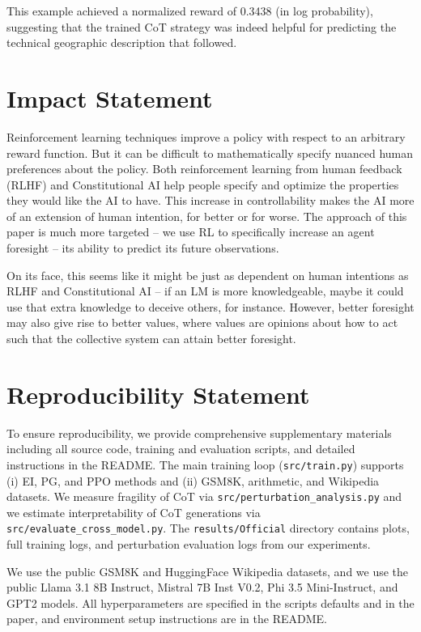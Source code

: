 \documentclass{article}
\begin{document}
This example achieved a normalized reward of 0.3438 (in log probability), suggesting that the trained CoT strategy was indeed helpful for predicting the technical geographic description that followed.


\section{Impact Statement}
\label{sec:ethics}
Reinforcement learning techniques improve a policy with respect to an arbitrary reward function. But it can be difficult to mathematically specify nuanced human preferences about the policy. Both reinforcement learning from human feedback (RLHF) \citep{christiano2023deepreinforcementlearninghuman} and Constitutional AI \citep{bai2022constitutional} help people specify and optimize the properties they would like the AI to have. This increase in controllability makes the AI more of an extension of human intention, for better or for worse. The approach of this paper is much more targeted -- we use RL to specifically increase an agent foresight -- its ability to predict its future observations. 

On its face, this seems like it might be just as dependent on human intentions as RLHF and Constitutional AI -- if an LM is more knowledgeable, maybe it could use that extra knowledge to deceive others, for instance. However, better foresight may also give rise to better values, where values are opinions about how to act such that the collective system can attain better foresight.

\section{Reproducibility Statement}
To ensure reproducibility, we provide comprehensive supplementary materials including all source code, training and evaluation scripts, and detailed instructions in the README. The main training loop (\texttt{src/train.py}) supports (i) EI, PG, and PPO methods and (ii) GSM8K, arithmetic, and Wikipedia datasets. We measure fragility of CoT via \texttt{src/perturbation\_analysis.py} and we estimate interpretability of CoT generations via \texttt{src/evaluate\_cross\_model.py}. The \texttt{results/Official} directory contains plots, full training logs, and perturbation evaluation logs from our experiments. 

We use the public GSM8K and HuggingFace Wikipedia datasets, and we use the public Llama 3.1 8B Instruct, Mistral 7B Inst V0.2, Phi 3.5 Mini-Instruct, and GPT2 models. All hyperparameters are specified in the scripts defaults and in the paper, and environment setup instructions are in the README. 
\end{document}
